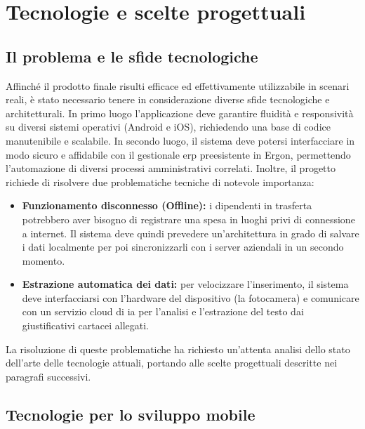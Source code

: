 \chapter{Tecnologie e scelte progettuali}
\label{chap:tecnologie-strumenti}

\section{Il problema e le sfide tecnologiche}
\label{sec:problematiche-tecnologiche}
\noindent Affinché il prodotto finale risulti efficace ed effettivamente utilizzabile in scenari reali, è stato necessario tenere in considerazione diverse sfide tecnologiche e architetturali. \newline
In primo luogo l'applicazione deve garantire fluidità e responsività su diversi sistemi operativi (Android e iOS), richiedendo una base di codice manutenibile e scalabile. In secondo luogo, il sistema deve potersi interfacciare in modo sicuro e affidabile con il gestionale \gls{erp} preesistente in Ergon, permettendo l'automazione di diversi processi amministrativi correlati. \newline
Inoltre, il progetto richiede di risolvere due problematiche tecniche di notevole importanza:
\begin{itemize}
    \item \textbf{Funzionamento disconnesso (Offline):} i dipendenti in trasferta potrebbero aver bisogno di registrare una spesa in luoghi privi di connessione a internet. Il sistema deve quindi prevedere un'architettura in grado di salvare i dati localmente per poi sincronizzarli con i server aziendali in un secondo momento.
    \item \textbf{Estrazione automatica dei dati:} per velocizzare l'inserimento, il sistema deve interfacciarsi con l'hardware del dispositivo (la fotocamera) e comunicare con un servizio cloud di \gls{ia} per l'analisi e l'estrazione del testo dai giustificativi cartacei allegati.
\end{itemize}
La risoluzione di queste problematiche ha richiesto un'attenta analisi dello stato dell'arte delle tecnologie attuali, portando alle scelte progettuali descritte nei paragrafi successivi.


\section{Tecnologie per lo sviluppo mobile}
\label{sec:tecnologie-sviluppo-mobile}

